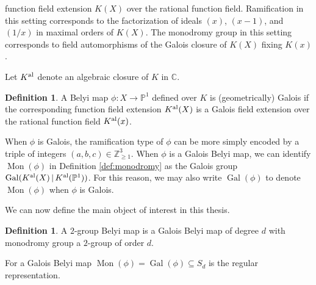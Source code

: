 \documentclass{dcthesis}
\newcommand{\PP}{\mathbb P}
\newcommand{\CC}{\mathbb C}
\newcommand{\ZZ}{\mathbb Z}
\newcommand{\defi}[1]{\textsf{#1}}
\newcommand{\Kal}{{{K}^{\textup{al}}}}
\DeclareMathOperator{\Aut}{Aut}
\DeclareMathOperator{\Mon}{Mon}
\DeclareMathOperator{\Gal}{Gal}
\numberwithin{equation}{section}
\newtheorem{prop}[equation]{Proposition}
\theoremstyle{definition}
\newtheorem{definition}[equation]{Definition}
\theoremstyle{remark}
\begin{document}
{{{    function field extension $K(X)$
    over the rational function field.
    Ramification in this setting corresponds
    to the factorization of ideals
    $(x)$, $(x-1)$, and $(1/x)$
    in maximal orders of $K(X)$.
    The monodromy group in this setting
    corresponds to field automorphisms
    of the Galois closure of $K(X)$
    fixing $K(x)$.
    \par
    Let $\Kal$
    denote an algebraic closure of $K$ in $\CC$.
    \begin{definition}\label{def:galoisbelyi}
      A Belyi map $\phi\colon X\to\PP^1$
      defined over $K$
      is \defi{(geometrically) Galois}
      if the corresponding
      function field extension
      $\Kal(X)$ is a Galois field extension
      over the rational function field
      $\Kal(x)$.
    \end{definition}
    When $\phi$ is Galois,
    the ramification type of
    $\phi$ can be
    more simply encoded by
    a triple of integers
    $(a,b,c)\in\ZZ_{\geq 1}^3$.
    When $\phi$ is a Galois Belyi map,
    we can identify $\Mon(\phi)$
    in Definition \ref{def:monodromy}
    as the Galois group
    $\Gal(\Kal(X)\,|\,\Kal(\PP^1))$.
    For this reason,
    we may also write $\Gal(\phi)$
    to denote $\Mon(\phi)$ when $\phi$
    is Galois.
    \par
    We can now define the main object of
    interest in this thesis.
    \begin{definition}
      \label{def:2gbm}
      A \defi{$2$-group Belyi map}
      is a Galois Belyi map
      of degree $d$
      with monodromy group a
      $2$-group of order $d$.
    \end{definition}
    For a Galois Belyi map
    $\Mon(\phi)=\Gal(\phi)\subseteq S_d$
    is the regular representation.
}}}
\end{document}
